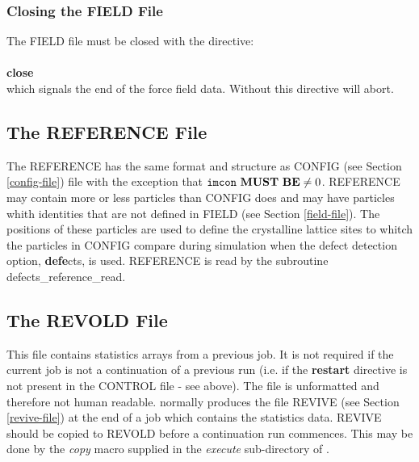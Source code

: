 \begin{table}[htbp]
\end{table}

\subsubsection{Closing the FIELD File}

The FIELD file must be closed with the directive:\\
\\
{\bf close}
\\
\noindent which signals the end of the force field data.  Without
this directive \D will abort.

\subsection{The REFERENCE File}
\label{reference-file}

The REFERENCE has the same format and structure as CONFIG
(see Section \ref{config-file}) file with the exception that
${\tt imcon}~{\bf MUST~BE} \ne 0$.  REFERENCE may contain
more or less particles than CONFIG does and may have
particles whith identities that are not defined in FIELD
(see Section \ref{field-file}).  The positions of these
particles are used to define the crystalline lattice sites
to whitch the particles in CONFIG compare during simulation
when the defect detection option, {\bf defe}cts, is used.
REFERENCE is read by the subroutine {\sc defects\_reference\_read}.

\subsection{The REVOLD File}
\label{revold-file}

This file contains statistics arrays from a previous job.  It is
not required if the current job is not a continuation of a
previous run (i.e. if the {\bf restart} directive is not present
in the CONTROL file - see above).  The file is unformatted and
therefore not human readable.  \D normally produces the file
REVIVE (see Section \ref{revive-file}) at the end of a job which
contains the statistics data.  REVIVE should be copied to REVOLD
before a continuation run commences.  This may be done by the {\sl
copy} macro supplied in the {\em execute} sub-directory of \D.

